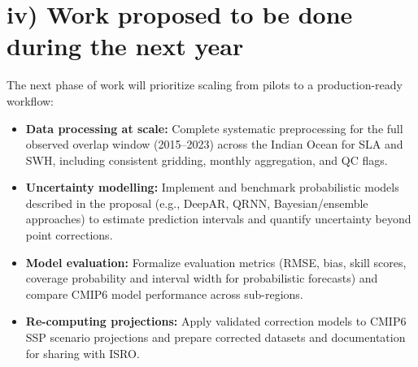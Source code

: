 \documentclass[11pt,a4paper]{article}
\begin{document}
\section*{iv) Work proposed to be done during the next year}
The next phase of work will prioritize scaling from pilots to a production-ready workflow:
\begin{itemize}
    \item \textbf{Data processing at scale:} Complete systematic preprocessing for the full observed overlap window (2015--2023) across the Indian Ocean for SLA and SWH, including consistent gridding, monthly aggregation, and QC flags.
    \item \textbf{Uncertainty modelling:} Implement and benchmark probabilistic models described in the proposal (e.g., DeepAR, QRNN, Bayesian/ensemble approaches) to estimate prediction intervals and quantify uncertainty beyond point corrections.
    \item \textbf{Model evaluation:} Formalize evaluation metrics (RMSE, bias, skill scores, coverage probability and interval width for probabilistic forecasts) and compare CMIP6 model performance across sub-regions.
    \item \textbf{Re-computing projections:} Apply validated correction models to CMIP6 SSP scenario projections and prepare corrected datasets and documentation for sharing with ISRO.
\end{itemize}
\end{document}
